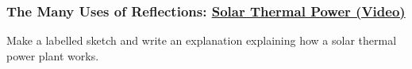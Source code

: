 \documentclass[t]{beamer}
\begin{document}
\begin{frame}
\frametitle{The Many Uses of Reflections: \href{http://drpineda.ca/classroom/notes/Science8/LightAndOptics/media/Solar-thermal-power.html}{Solar Thermal Power (Video)}}
Make a labelled sketch and write an explanation explaining how a solar thermal power plant works.
\end{frame}
\end{document}
